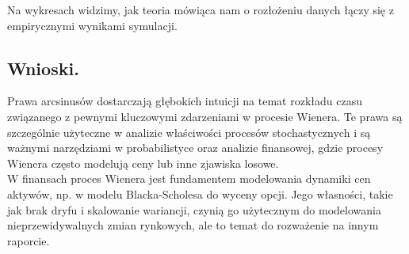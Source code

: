 \documentclass[12pt,letterpaper]{article}
\theoremstyle{definition}
\begin{document}
Na wykresach widzimy, jak teoria mówiąca nam o rozłożeniu danych łączy się z empirycznymi wynikami symulacji.
\subsection{Wnioski.}
Prawa arcsinusów dostarczają głębokich intuicji na temat rozkładu czasu związanego z pewnymi kluczowymi zdarzeniami w procesie Wienera. Te prawa są szczególnie użyteczne w analizie właściwości procesów stochastycznych i są ważnymi narzędziami w probabilistyce oraz analizie finansowej, gdzie procesy Wienera często modelują ceny lub inne zjawiska losowe.\\

W finansach proces Wienera jest fundamentem modelowania dynamiki cen aktywów, np. w modelu Blacka-Scholesa do wyceny opcji. Jego własności, takie jak brak dryfu i skalowanie wariancji, czynią go użytecznym do modelowania nieprzewidywalnych zmian rynkowych, ale to temat do rozważenie na innym raporcie.
\end{document}
